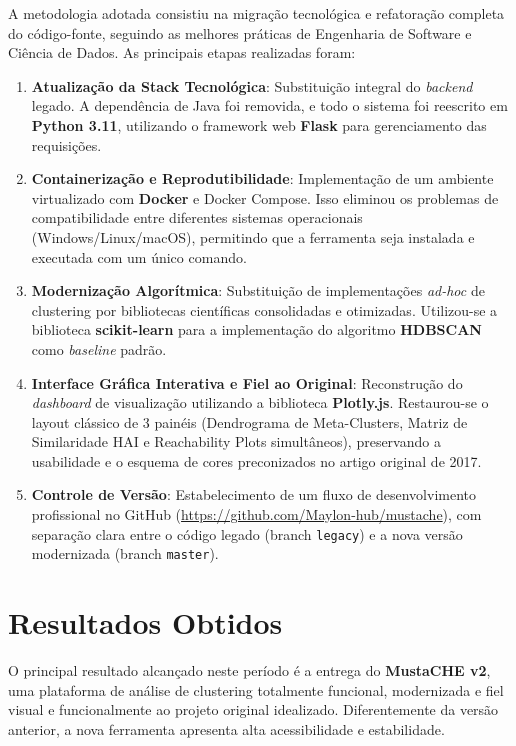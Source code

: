 \documentclass[12pt,a4paper]{article}
\begin{document}
A metodologia adotada consistiu na migração tecnológica e refatoração completa do código-fonte, seguindo as melhores práticas de Engenharia de Software e Ciência de Dados. As principais etapas realizadas foram:

\begin{enumerate}
    \item \textbf{Atualização da Stack Tecnológica}: Substituição integral do \textit{backend} legado. A dependência de Java foi removida, e todo o sistema foi reescrito em \textbf{Python 3.11}, utilizando o framework web \textbf{Flask} para gerenciamento das requisições.
    \item \textbf{Containerização e Reprodutibilidade}: Implementação de um ambiente virtualizado com \textbf{Docker} e Docker Compose. Isso eliminou os problemas de compatibilidade entre diferentes sistemas operacionais (Windows/Linux/macOS), permitindo que a ferramenta seja instalada e executada com um único comando.
    \item \textbf{Modernização Algorítmica}: Substituição de implementações \textit{ad-hoc} de clustering por bibliotecas científicas consolidadas e otimizadas. Utilizou-se a biblioteca \textbf{scikit-learn} para a implementação do algoritmo \textbf{HDBSCAN} como \textit{baseline} padrão.
    \item \textbf{Interface Gráfica Interativa e Fiel ao Original}: Reconstrução do \textit{dashboard} de visualização utilizando a biblioteca \textbf{Plotly.js}. Restaurou-se o layout clássico de 3 painéis (Dendrograma de Meta-Clusters, Matriz de Similaridade HAI e Reachability Plots simultâneos), preservando a usabilidade e o esquema de cores preconizados no artigo original de 2017.
    \item \textbf{Controle de Versão}: Estabelecimento de um fluxo de desenvolvimento profissional no GitHub (\url{https://github.com/Maylon-hub/mustache}), com separação clara entre o código legado (branch \texttt{legacy}) e a nova versão modernizada (branch \texttt{master}).
\end{enumerate}

\section{Resultados Obtidos}

O principal resultado alcançado neste período é a entrega do \textbf{MustaCHE v2}, uma plataforma de análise de clustering totalmente funcional, modernizada e fiel visual e funcionalmente ao projeto original idealizado. Diferentemente da versão anterior, a nova ferramenta apresenta alta acessibilidade e estabilidade.
\end{document}
